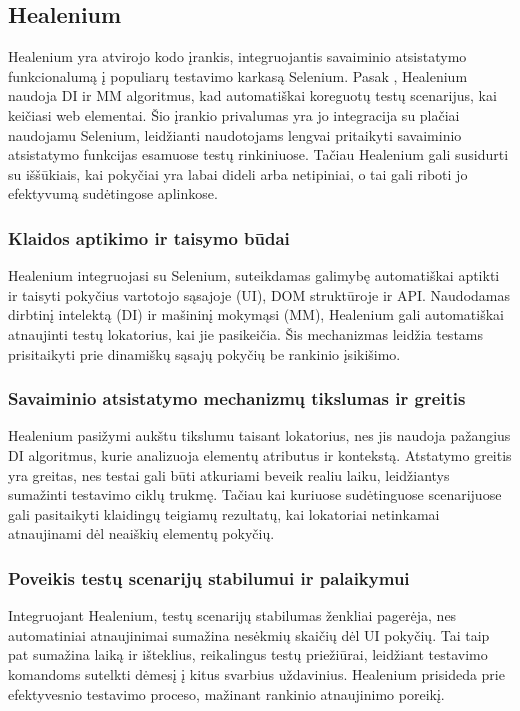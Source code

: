 \documentclass[
]{VUMIFPSkursinis}
\begin{document}
\subsection{Healenium} 

Healenium yra atvirojo kodo įrankis, integruojantis savaiminio atsistatymo funkcionalumą į populiarų testavimo karkasą Selenium. Pasak \cite{Khankhoje2023}, Healenium naudoja DI ir MM algoritmus, kad automatiškai koreguotų testų scenarijus, kai keičiasi web elementai. Šio įrankio privalumas yra jo integracija su plačiai naudojamu Selenium, leidžianti naudotojams lengvai pritaikyti savaiminio atsistatymo funkcijas esamuose testų rinkiniuose. Tačiau Healenium gali susidurti su iššūkiais, kai pokyčiai yra labai dideli arba netipiniai, o tai gali riboti jo efektyvumą sudėtingose aplinkose. \cite{Healenium}

\subsubsection{Klaidos aptikimo ir taisymo būdai}

Healenium integruojasi su Selenium, suteikdamas galimybę automatiškai aptikti ir taisyti pokyčius vartotojo sąsajoje (UI), DOM struktūroje ir API. Naudodamas dirbtinį intelektą (DI) ir mašininį mokymąsi (MM), Healenium gali automatiškai atnaujinti testų lokatorius, kai jie pasikeičia. Šis mechanizmas leidžia testams prisitaikyti prie dinamiškų sąsajų pokyčių be rankinio įsikišimo.

\subsubsection{Savaiminio atsistatymo mechanizmų tikslumas ir greitis}

Healenium pasižymi aukštu tikslumu taisant lokatorius, nes jis naudoja pažangius DI algoritmus, kurie analizuoja elementų atributus ir kontekstą. Atstatymo greitis yra greitas, nes testai gali būti atkuriami beveik realiu laiku, leidžiantys sumažinti testavimo ciklų trukmę. Tačiau kai kuriuose sudėtinguose scenarijuose gali pasitaikyti klaidingų teigiamų rezultatų, kai lokatoriai netinkamai atnaujinami dėl neaiškių elementų pokyčių.

\subsubsection{Poveikis testų scenarijų stabilumui ir palaikymui}

Integruojant Healenium, testų scenarijų stabilumas ženkliai pagerėja, nes automatiniai atnaujinimai sumažina nesėkmių skaičių dėl UI pokyčių. Tai taip pat sumažina laiką ir išteklius, reikalingus testų priežiūrai, leidžiant testavimo komandoms sutelkti dėmesį į kitus svarbius uždavinius. Healenium prisideda prie efektyvesnio testavimo proceso, mažinant rankinio atnaujinimo poreikį.
\end{document}
